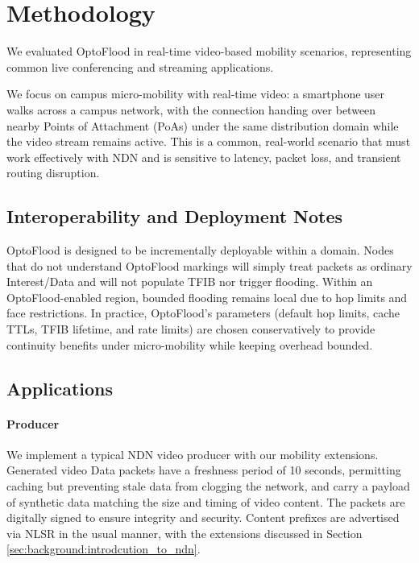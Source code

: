 
\section{Methodology}
\label{sec:optoflood:methodology}

We evaluated OptoFlood in real-time video-based mobility scenarios, representing common live conferencing and streaming applications.

We focus on campus micro-mobility with real-time video: a smartphone user walks across a campus network, with the connection handing over between nearby Points of Attachment (PoAs) under the same distribution domain while the video stream remains active. This is a common, real-world scenario that must work effectively with NDN and is sensitive to latency, packet loss, and transient routing disruption.

\subsection{Interoperability and Deployment Notes}
OptoFlood is designed to be incrementally deployable within a domain. Nodes that do not understand OptoFlood markings will simply treat packets as ordinary Interest/Data and will not populate TFIB nor trigger flooding. Within an OptoFlood-enabled region, bounded flooding remains local due to hop limits and face restrictions. In practice, OptoFlood's parameters (default hop limits, cache TTLs, TFIB lifetime, and rate limits) are chosen conservatively to provide continuity benefits under micro-mobility while keeping overhead bounded.

\subsection{Applications}
\paragraph{Producer}
We implement a typical NDN video producer with our mobility extensions. Generated video Data packets have a freshness period of 10 seconds, permitting caching but preventing stale data from clogging the network, and carry a payload of synthetic data matching the size and timing of video content. The packets are digitally signed to ensure integrity and security. Content prefixes are advertised via NLSR in the usual manner, with the extensions discussed in Section \ref{sec:background:introdcution_to_ndn}.

